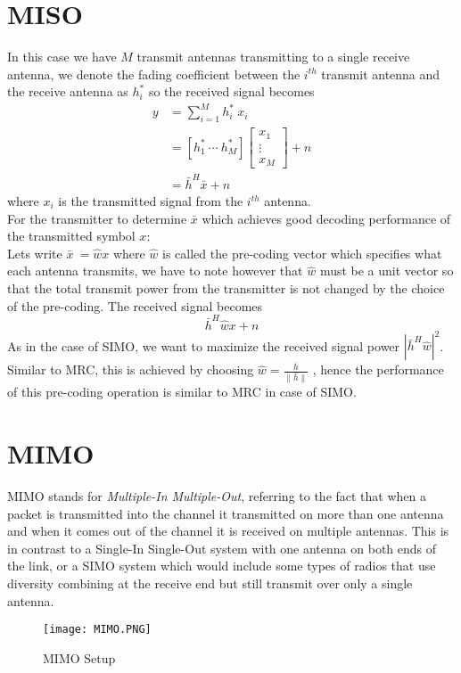 \section{MISO}
In this case we have $M$ transmit antennas transmitting to a single receive antenna, we denote the fading coefficient between the $i^{th}$ transmit antenna and the receive antenna as $h_i^\ast$ so the  received signal becomes 
\begin{equation}
    \label{eq:MISO y}
    \begin{aligned}
        y &= \sum_{i=1}^{M} h_i^\ast\ x_i \\
        &= \left[ h_1^\ast \  \cdots \ h_M^\ast \right] \left[ \begin{array}{c}
            x_1 \\
            \vdots \\
            x_M
        \end{array} \right] + n \\
        &= \bar{h}^H \bar{x} + n
    \end{aligned}
\end{equation}
where $x_i$ is the transmitted signal from the $i^{th}$ antenna.\\
For the transmitter to determine $\bar{x}$ which achieves good decoding performance of the transmitted symbol $x$: \\
Lets write $\bar{x}\ =\hat{w}x$ where $\hat{w}$ is called the pre-coding vector which specifies what each antenna transmits, we have to note however that $\hat{w}$ must be a unit vector so that the total transmit power from the transmitter is not changed by the choice of the pre-coding. The received signal becomes
\[ \bar{h}^H \hat{w} x + n \]
As in the case of SIMO, we want to maximize the received signal power $\left|{\bar{h}}^H\hat{w}\right|^2$. Similar to MRC, this is achieved by choosing $\hat{w}=\frac{\bar{h}}{\|\bar{h}\|}$ , hence the performance of this pre-coding operation is similar to MRC in case of SIMO.

\section{MIMO}
MIMO stands for \emph{Multiple-In Multiple-Out}, referring to the fact that when a packet is transmitted into the channel it transmitted on more than one antenna and when it comes out of the channel it is received on multiple antennas. This is in contrast to a Single-In Single-Out system with one antenna on both ends of the link, or a SIMO system which would include some types of radios that use diversity combining at the receive end but still transmit over only a single antenna.
\begin{figure}[ht]
    \centering
    \texttt{[image: MIMO.PNG]}
    \caption{MIMO Setup}
    \label{fig:MIMO}
\end{figure}

